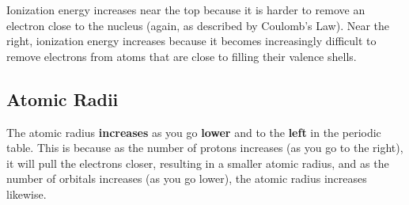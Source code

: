 \documentclass[a4paper, 12pt]{article}
\begin{document}
Ionization energy increases near the top because it is harder to remove an electron close to the nucleus (again, as described by Coulomb's Law). Near the right, ionization energy increases because it becomes increasingly difficult to remove electrons from atoms that are close to filling their valence shells.

\subsection*{Atomic Radii}
The atomic radius \textbf{increases} as you go \textbf{lower} and to the \textbf{left} in the periodic table. This is because as the number of protons increases (as you go to the right), it will pull the electrons closer, resulting in a smaller atomic radius, and as the number of orbitals increases (as you go lower), the atomic radius increases likewise.
\end{document}

